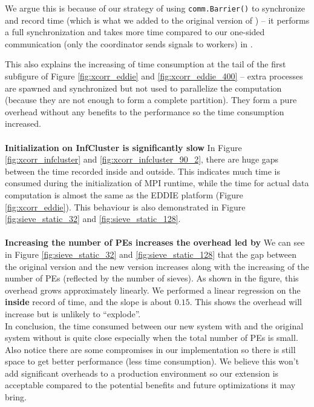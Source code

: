 We argue this is because of our strategy of using \lstinline|comm.Barrier()| to synchronize and record time (which is what we added to the original version of \dpy) -- it performs a full synchronization and takes more time compared to our one-sided communication (only the coordinator sends signals to workers) in \tincdep.

This also explains the increasing of time consumption at the tail of the first subfigure of Figure \ref{fig:xcorr_eddie} and \ref{fig:xcorr_eddie_400} -- extra processes are spawned and synchronized but not used to parallelize the computation (because they are not enough to form a complete partition). They form a pure overhead without any benefits to the performance so the time consumption increased. \\\\
\textbf{Initialization on InfCluster is significantly slow}\quad
In Figure \ref{fig:xcorr_infcluster} and \ref{fig:xcorr_infcluster_90_2}, there are huge gaps between the time recorded inside and outside. This indicates much time is consumed during the initialization of MPI runtime, while the time for actual data computation is almost the same as the EDDIE platform (Figure \ref{fig:xcorr_eddie}). This behaviour is also demonstrated in Figure \ref{fig:sieve_static_32} and \ref{fig:sieve_static_128}. \\\\
\textbf{Increasing the number of PEs increases the overhead led by \tincdep}\quad
We can see in Figure \ref{fig:sieve_static_32} and \ref{fig:sieve_static_128} that the gap between the original version and the new version increases along with the increasing of the number of PEs (reflected by the number of sieves). As shown in the figure, this overhead grows approximately linearly. We performed a linear regression on the \textbf{inside} record of time, and the slope is about $0.15$. This shows the overhead will increase but is unlikely to ``explode''. \\

In conclusion, the time consumed between our new system with \tincdep and the original system without \tincdep is quite close especially when the total number of PEs is small. Also notice there are some compromises in our implementation so there is still space to get better performance (\ie less time consumption). We believe this won't add significant overheads to a production environment so our extension is acceptable compared to the potential benefits and future optimizations it may bring.

